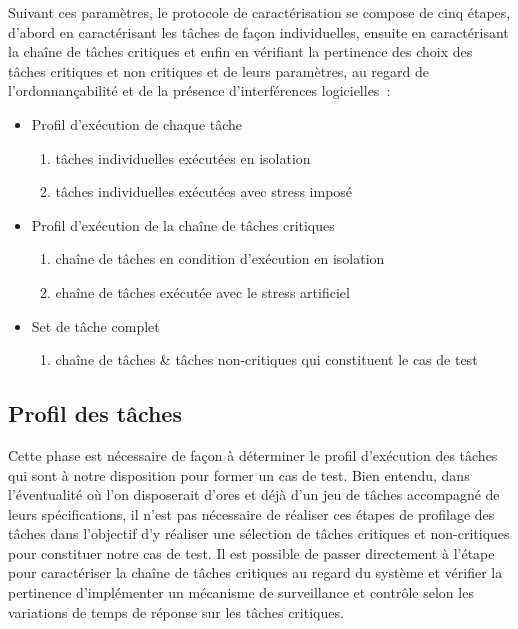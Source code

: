 \documentclass[french, a4paper, 11pt, twoside, pdftex]{StyleThese}
\begin{document}
        Suivant ces paramètres, le protocole de caractérisation se compose de cinq étapes, d'abord en caractérisant les tâches de façon individuelles, ensuite en caractérisant la chaîne de tâches critiques et enfin en vérifiant la pertinence des choix des tâches critiques et non critiques et de leurs paramètres, au regard de l'ordonnançabilité et de la présence d'interférences logicielles~: 
        \begin{itemize}
        	\item Profil d'exécution de chaque tâche
	        \begin{enumerate}[label=\large\ctxt{\arabic*}]
	        	\item tâches individuelles exécutées en isolation
	        	\item tâches individuelles exécutées avec stress imposé
	        \end{enumerate}
        	\item Profil d'exécution de la chaîne de tâches critiques
        	\begin{enumerate}[resume*]
        		\item chaîne de tâches en condition d'exécution en isolation
        		\item chaîne de tâches exécutée avec le stress artificiel
        	\end{enumerate}
        	\item Set de tâche complet
        	\begin{enumerate}[resume*]
        		\item chaîne de tâches \& tâches non-critiques qui constituent le cas de test 
        	\end{enumerate}
        \end{itemize}
    

	\subsection{Profil des tâches}
		Cette phase est nécessaire de façon à déterminer le profil d'exécution des tâches qui sont à notre disposition pour former un cas de test. Bien entendu, dans l'éventualité où l'on disposerait d'ores et déjà d'un jeu de tâches accompagné de leurs spécifications, il n'est pas nécessaire de réaliser ces étapes de profilage des tâches dans l'objectif d'y réaliser une sélection de tâches critiques et non-critiques pour constituer notre cas de test. Il est possible de passer directement à l'étape~ pour caractériser la chaîne de tâches critiques au regard du système et vérifier la pertinence d'implémenter un mécanisme de surveillance et contrôle selon les variations de temps de réponse sur les tâches critiques. 
		
\end{document}
